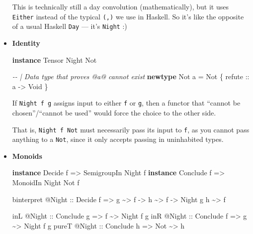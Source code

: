 \documentclass[]{article}
\newenvironment{Shaded}{}{}
\newcommand{\CommentTok}[1]{\textcolor[rgb]{0.38,0.63,0.69}{\textit{#1}}}
\newcommand{\DataTypeTok}[1]{\textcolor[rgb]{0.56,0.13,0.00}{#1}}
\newcommand{\KeywordTok}[1]{\textcolor[rgb]{0.00,0.44,0.13}{\textbf{#1}}}
\newcommand{\NormalTok}[1]{#1}
\newcommand{\OperatorTok}[1]{\textcolor[rgb]{0.40,0.40,0.40}{#1}}
\newcommand{\OtherTok}[1]{\textcolor[rgb]{0.00,0.44,0.13}{#1}}
\begin{document}
\begin{itemize}
  This is technically still a day convolution (mathematically), but it uses
  \texttt{Either} instead of the typical \texttt{(,)} we use in Haskell. So it's
  like the opposite of a usual Haskell \texttt{Day} --- it's \texttt{Night} :)
\item
  \textbf{Identity}

\begin{Shaded}
\begin{Highlighting}[]
\KeywordTok{instance} \DataTypeTok{Tensor} \DataTypeTok{Night} \DataTypeTok{Not}

\CommentTok{{-}{-} | Data type that proves @a@ cannot exist}
\KeywordTok{newtype} \DataTypeTok{Not}\NormalTok{ a }\OtherTok{=} \DataTypeTok{Not}\NormalTok{ \{}\OtherTok{ refute ::}\NormalTok{ a }\OtherTok{{-}\textgreater{}} \DataTypeTok{Void}\NormalTok{ \}}
\end{Highlighting}
\end{Shaded}

  If \texttt{Night\ f\ g} assigns input to either \texttt{f} or \texttt{g}, then
  a functor that ``cannot be chosen''/``cannot be used'' would force the choice
  to the other side.

  That is, \texttt{Night\ f\ Not} must necessarily pass its input to \texttt{f},
  as you cannot pass anything to a \texttt{Not}, since it only accepts passing
  in uninhabited types.
\item
  \textbf{Monoids}

\begin{Shaded}
\begin{Highlighting}[]
\KeywordTok{instance} \DataTypeTok{Decide}\NormalTok{   f }\OtherTok{=\textgreater{}} \DataTypeTok{SemigroupIn} \DataTypeTok{Night}\NormalTok{ f}
\KeywordTok{instance} \DataTypeTok{Conclude}\NormalTok{ f }\OtherTok{=\textgreater{}} \DataTypeTok{MonoidIn}    \DataTypeTok{Night} \DataTypeTok{Not}\NormalTok{ f}

\NormalTok{binterpret }\OperatorTok{@}\DataTypeTok{Night}
\OtherTok{    ::} \DataTypeTok{Decide}\NormalTok{ f}
    \OtherTok{=\textgreater{}}\NormalTok{ g }\OperatorTok{\textasciitilde{}\textgreater{}}\NormalTok{ f}
    \OtherTok{{-}\textgreater{}}\NormalTok{ h }\OperatorTok{\textasciitilde{}\textgreater{}}\NormalTok{ f}
    \OtherTok{{-}\textgreater{}} \DataTypeTok{Night}\NormalTok{ g h }\OperatorTok{\textasciitilde{}\textgreater{}}\NormalTok{ f}

\NormalTok{inL   }\OperatorTok{@}\DataTypeTok{Night}\OtherTok{ ::} \DataTypeTok{Conclude}\NormalTok{ g }\OtherTok{=\textgreater{}}\NormalTok{ f   }\OperatorTok{\textasciitilde{}\textgreater{}} \DataTypeTok{Night}\NormalTok{ f g}
\NormalTok{inR   }\OperatorTok{@}\DataTypeTok{Night}\OtherTok{ ::} \DataTypeTok{Conclude}\NormalTok{ f }\OtherTok{=\textgreater{}}\NormalTok{ g   }\OperatorTok{\textasciitilde{}\textgreater{}} \DataTypeTok{Night}\NormalTok{ f g}
\NormalTok{pureT }\OperatorTok{@}\DataTypeTok{Night}\OtherTok{ ::} \DataTypeTok{Conclude}\NormalTok{ h }\OtherTok{=\textgreater{}} \DataTypeTok{Not} \OperatorTok{\textasciitilde{}\textgreater{}}\NormalTok{ h}
\end{Highlighting}
\end{Shaded}


\end{itemize}
\end{document}
